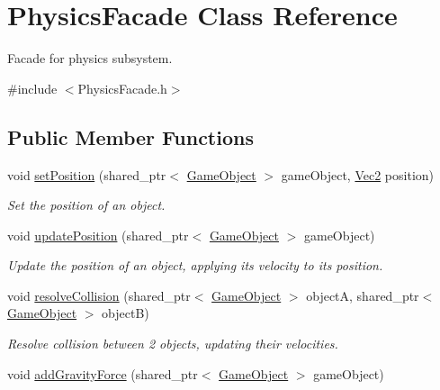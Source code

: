 \hypertarget{class_physics_facade}{}\section{Physics\+Facade Class Reference}
\label{class_physics_facade}


Facade for physics subsystem.  




{\ttfamily \#include $<$Physics\+Facade.\+h$>$}

\subsection*{Public Member Functions}
\begin{DoxyCompactItemize}
\item 
void \mbox{\hyperlink{class_physics_facade_a1a74ada6cb5fd3cac339165dbc506b8d}{set\+Position}} (shared\+\_\+ptr$<$ \mbox{\hyperlink{class_game_object}{Game\+Object}} $>$ game\+Object, \mbox{\hyperlink{struct_vec2}{Vec2}} position)
\begin{DoxyCompactList}\small\item\em Set the position of an object. \end{DoxyCompactList}\item 
void \mbox{\hyperlink{class_physics_facade_aabef1158811a4aae1bc786c7269ce794}{update\+Position}} (shared\+\_\+ptr$<$ \mbox{\hyperlink{class_game_object}{Game\+Object}} $>$ game\+Object)
\begin{DoxyCompactList}\small\item\em Update the position of an object, applying it\textquotesingle{}s velocity to it\textquotesingle{}s position. \end{DoxyCompactList}\item 
void \mbox{\hyperlink{class_physics_facade_a9d42e28b45cd542571e6f68cbefc41ff}{resolve\+Collision}} (shared\+\_\+ptr$<$ \mbox{\hyperlink{class_game_object}{Game\+Object}} $>$ objectA, shared\+\_\+ptr$<$ \mbox{\hyperlink{class_game_object}{Game\+Object}} $>$ objectB)
\begin{DoxyCompactList}\small\item\em Resolve collision between 2 objects, updating their velocities. \end{DoxyCompactList}\item 
void \mbox{\hyperlink{class_physics_facade_a0db40f3388826df2d9093f6a9ca90bd2}{add\+Gravity\+Force}} (shared\+\_\+ptr$<$ \mbox{\hyperlink{class_game_object}{Game\+Object}} $>$ game\+Object)

\end{DoxyCompactItemize}
